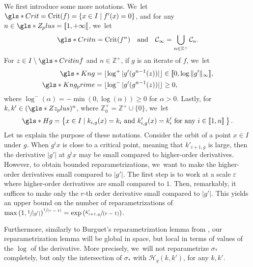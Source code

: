 \documentclass[11pt]{article}
\newcommand{\spfrac}[2]{\sfrac{#1}{(#2)}}
\DeclareMathOperator{\Crit}{Crit}
\theoremstyle{definition}
\newcommand{\bbZ}{{\mathbb{Z}}}
\begin{document}
We first introduce some more notations. We~let $\gls*{Crit} = \Crit(f) = \{ x \in I \mid f'(x) = 0 \}$, and for any
$n \in \gls*{Z_plus}=[\![ 1, + \infty [\![$, we~let
\[
\gls*{Critn} = \Crit(f^n) \quad \text{and} \quad \mathcal{C}_{\infty} = \bigcup_{n \in \bbZ^+} \mathcal{C}_n.
\]
For $z \in I \setminus \gls*{Critinf}$ and $n \in \bbZ^+$, if $g$ is an iterate of $f$, we~let
\begin{align*}
\gls*{Kng} &= \lfloor \log^+ |g'(g^{n-1}(z))| \rfloor \in [\![ 0, \log \| g' \|_{\infty} ]\!],\\
\gls*{Kng_prime} &= \lfloor \log^- |g'(g^{n-1}(z))| \rfloor \geq 0,
\end{align*}
where $\log^-(\alpha) = - \min(0, \log(\alpha)) \geq 0$ for $\alpha > 0$.
Lastly, for
$k,k' \in (\gls*{Zz_plus})^n$, where $\bbZ_0^+ = \bbZ^+ \cup \{ 0 \}$, we~let
\[
\gls*{Hg} = \left \{ x \in I \mid k_{i,g}(x) = k_i \text{ and } k_{i,g}'(x) = k_i' \text{ for any } i \in [\![ 1, n ]\!] \: \right \}.
\]
Let us explain the purpose of these notations.
Consider the orbit of a point $x \in I$ under $g$.
When $g^i x$ is close to a critical point, meaning that $k'_{i+1, g}$ is large, then the derivative $|g'|$ at $g^i x$ may be small compared to higher-order derivatives.
However, to obtain bounded reparametrizations, we~want to make the higher-order derivatives small compared to $|g'|$.
The first step is to work at a scale $\varepsilon$ where higher-order derivatives are small compared to $1$.
Then, remarkably, it suffices to make only the $r$\nobreakdash-th order derivative small compared to $|g'|$.
This yields an upper bound on the number of reparametrizations of $\max\left(1, \sfrac{1}{|g'|} \right)^{\spfrac{1}{r-1}} = \exp \left (\spfrac{k'_{i+1,g}}{r-1}\right)$.

Furthermore, similarly to Burguet's reparametrization lemma from \cite{MR4701884}, our reparametrization lemma will be global in space, but local in terms of values of the $\log$ of the derivative.
More precisely, we~will not reparametrize $\sigma_*$ completely, but only the intersection of $\sigma_*$ with $\mathcal{H}_g(k,k')$, for any $k, k'$.
\end{document}
